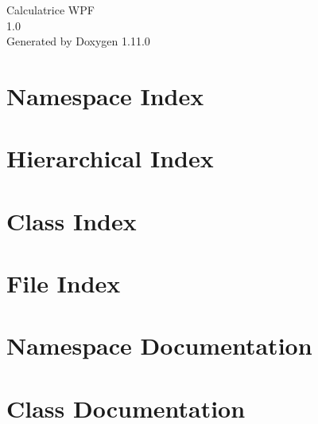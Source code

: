 \documentclass[twoside]{book}
\newcommand{\+}{\discretionary{\mbox{\scriptsize$\hookleftarrow$}}{}{}}
\newcommand{\clearemptydoublepage}{%
    \newpage{\pagestyle{empty}\cleardoublepage}%
  }
\begin{document}
  \raggedbottom
    \hypersetup{pageanchor=false,
                bookmarksnumbered=true,
                pdfencoding=unicode
               }
  \begin{titlepage}
  \vspace*{7cm}
  \begin{center}%
  {\Large Calculatrice WPF}\\
  [1ex]\large 1.\+0 \\
  \vspace*{1cm}
  {\large Generated by Doxygen 1.11.0}\\
  \end{center}
  \end{titlepage}
  \clearemptydoublepage
  \tableofcontents
  \clearemptydoublepage
  \hypersetup{pageanchor=true}
\chapter{Namespace Index}

\chapter{Hierarchical Index}

\chapter{Class Index}

\chapter{File Index}

\chapter{Namespace Documentation}


\chapter{Class Documentation}



\end{document}
